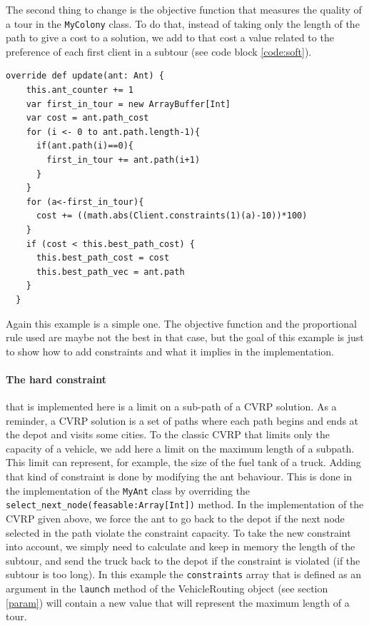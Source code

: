 The second thing to change is the objective function that measures the quality of a tour in the \texttt{MyColony} class. To do that, instead of taking only the length of the path to give a cost to a solution, we add to that cost a value related to the preference of each first client in a subtour (see code block \ref{code:soft}).

\begin{lstlisting}[captionpos=b, caption = Taking the preference into account , label= code:soft]
  override def update(ant: Ant) {
    this.ant_counter += 1
    var first_in_tour = new ArrayBuffer[Int]
    var cost = ant.path_cost
    for (i <- 0 to ant.path.length-1){
      if(ant.path(i)==0){
        first_in_tour += ant.path(i+1)
      }
    }
    for (a<-first_in_tour){
      cost += ((math.abs(Client.constraints(1)(a)-10))*100)
    }
    if (cost < this.best_path_cost) {
      this.best_path_cost = cost
      this.best_path_vec = ant.path
    }
  }
	\end{lstlisting}
	
	Again this example is a simple one. The objective function and the proportional rule used are maybe not the best in that case, but the goal of this example is just to show how to add constraints and what it implies in the implementation.

\paragraph{The hard constraint} that is implemented here is a limit on a sub-path of a CVRP solution. As a reminder, a CVRP solution is a set of paths where each path begins and ends at the depot and visits some cities. To the classic CVRP that limits only the capacity of a vehicle, we add here a limit on the maximum length of a subpath. This limit can represent, for example, the size of the fuel tank of a truck. Adding that kind of constraint is done by modifying the ant behaviour. This is done in the implementation of the \texttt{MyAnt} class by overriding the \texttt{select\_next\_node(feasable:Array[Int])} method. In the implementation of the CVRP given above, we force the ant to go back to the depot if the next node selected in the path violate the constraint capacity. To take the new constraint into account, we simply need to calculate and keep in memory the length of the subtour, and send the truck back to the depot if the constraint is violated (if the subtour is too long).
In this example the \texttt{constraints} array that is defined as an argument in the \texttt{launch} method of the VehicleRouting object (see section \ref{param}) will contain a new value that will represent the maximum length of a tour.


